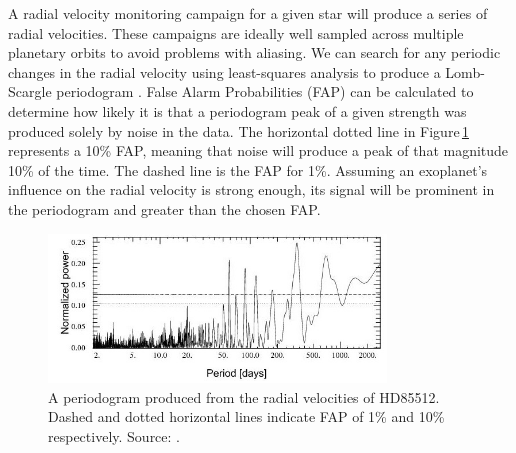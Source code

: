 A radial velocity monitoring campaign for a given star will produce a series of radial velocities. These campaigns are ideally well sampled across multiple planetary orbits to avoid problems with aliasing. We can search for any periodic changes in the radial velocity using least-squares analysis to produce a Lomb-Scargle periodogram \citep{1976Lomb,1982Scargle}. False Alarm Probabilities (FAP) can be calculated to determine how likely it is that a periodogram peak of a given strength was produced solely by noise in the data. The horizontal dotted line in Figure\,\ref{figHD85512Power} represents a 10\% FAP, meaning that noise will produce a peak of that magnitude 10\% of the time. The dashed line is the FAP for 1\%. Assuming an exoplanet's influence on the radial velocity is strong enough, its signal will be prominent in the periodogram and greater than the chosen FAP.\\

\begin{figure}
    \centering
    \includegraphics[width=0.8\textwidth]{HD85512_Power.jpg}
    \caption{A periodogram produced from the radial velocities of HD85512. Dashed and dotted horizontal lines indicate FAP of 1\% and 10\% respectively. Source: \citet{2011Pepe}.}
    \label{figHD85512Power}
\end{figure}

